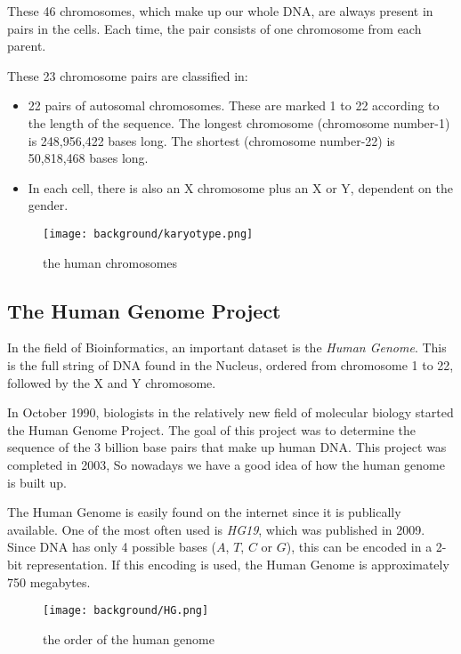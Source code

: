 These 46 chromosomes, which make up our whole DNA, are always present in pairs in the cells. Each time, the pair consists of one chromosome from each parent. 

These 23 chromosome pairs are classified in:
\begin{itemize}
	\item 22 pairs of autosomal chromosomes. These are marked 1 to 22 according to the length of the sequence. The longest chromosome (chromosome number-1) is 248,956,422 bases long. The shortest (chromosome number-22) is 50,818,468 bases long.
	\item In each cell, there is also an X chromosome plus an X or Y, dependent on the gender.
\end{itemize}


\begin{figure}[H]
	\centering
	\texttt{[image: background/karyotype.png]}
	\caption{the human chromosomes}
	\label{fig:karyotype}
\end{figure}


\subsection{The Human Genome Project}

In the field of Bioinformatics, an important dataset is the \emph{Human Genome}. This is the full string of DNA found in the Nucleus, ordered from chromosome 1 to 22, followed by the X and Y chromosome.

In October 1990, biologists in the relatively new field of molecular biology started the Human Genome Project. The goal of this project was to determine the sequence of the 3 billion base pairs that make up human DNA. This project was completed in 2003, So nowadays we have a good idea of how the human genome is built up.

The Human Genome is easily found on the internet since it is publically available. One of the most often used is \emph{HG19}, which was published in 2009. Since DNA has only 4 possible bases ($A$, $T$, $C$ or $G$), this can be encoded in a 2-bit representation. If this encoding is used, the Human Genome is approximately 750 megabytes.

\begin{figure}[H]
	\centering
	\texttt{[image: background/HG.png]}
	\caption{the order of the human genome}
	\label{fig:HG}
\end{figure}

